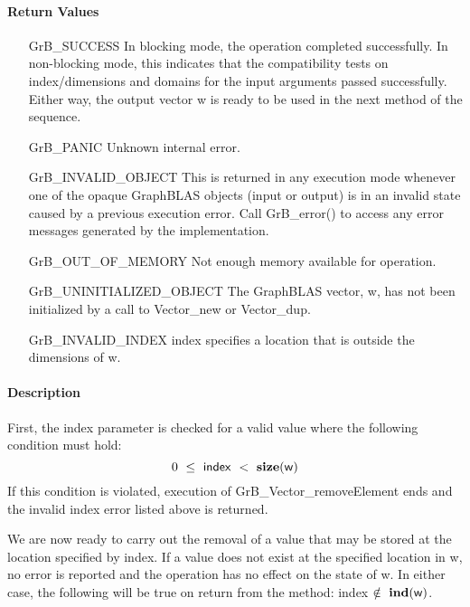 \paragraph{Return Values}

\begin{itemize}[leftmargin=2.1in]
    \item[{\sf GrB\_SUCCESS}]         In blocking mode, the operation completed
    successfully. In non-blocking mode, this indicates that the compatibility 
    tests on index/dimensions and domains for the input arguments passed successfully. 
    Either way, the output vector {\sf w} is ready to be used in the next method of 
    the sequence.

    \item[{\sf GrB\_PANIC}]   Unknown internal error.
    
    \item[{\sf GrB\_INVALID\_OBJECT}] This is returned in any execution mode 
    whenever one of the opaque GraphBLAS objects (input or output) is in an invalid 
    state caused by a previous execution error.  Call {\sf GrB\_error()} to access 
    any error messages generated by the implementation.

    \item[{\sf GrB\_OUT\_OF\_MEMORY}]  Not enough memory available for operation.
    
    \item[{\sf GrB\_UNINITIALIZED\_OBJECT}]  The GraphBLAS vector, {\sf w}, has 
    not been initialized by a call to {\sf Vector\_new} or {\sf Vector\_dup}.
    
    \item[{\sf GrB\_INVALID\_INDEX}]  {\sf index} specifies a location 
    that is outside the dimensions of {\sf w}.
\end{itemize}

\paragraph{Description}

First, the {\sf index} parameter is checked for a valid value where the following
condition must hold:
\[
	0\ \leq\ {\sf index}\ <\ \mathbf{size}({\sf w})
\]
If this condition is violated, execution of {\sf GrB\_Vector\_removeElement} 
ends and the invalid index error listed above is returned.

We are now ready to carry out the removal of a value that may be stored at the 
location specified by {\sf index}.  If a value does not exist at the specified 
location in {\sf w}, no error is reported and the operation has no effect on the 
state of {\sf w}.  In either case, the following will be true on return from the 
method: {\sf index} $\notin~\mathbf{ind}({\sf w})$.

